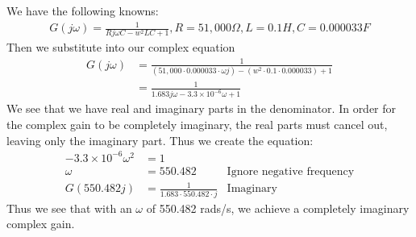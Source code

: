 \documentclass[12pt, a4paper]{article}
\begin{document}
\begin{enumerate}
We have the following knowns: 
\begin{align*}
G(j\omega) = \frac{1}{Rj\omega C - w^2 LC + 1}, R = 51,000 \Omega, L = 0.1 H, C = 0.000033 F
\end{align*}
Then we substitute into our complex equation
\begin{align*}
G(j\omega) &= \frac{1}{(51,000 \cdot 0.000033 \cdot \omega j) - (w^2 \cdot 0. 1 \cdot 0.000033) + 1} \\
&= \frac{1}{1.683 j \omega - 3.3 \times 10^{-6} \omega + 1}
\end{align*}
We see that we have real and imaginary parts in the denominator. In order for the complex gain to be completely imaginary, the real parts must cancel out, leaving only the imaginary part. Thus we create the equation:
\begin{align*}
-3.3\times 10^{-6} \omega ^2 &= 1 \\
\omega &= 550.482 &\text{Ignore negative frequency}\\
G(550.482 j) &= \frac{1}{1.683 \cdot 550.482 \cdot j} &\text{Imaginary}
\end{align*}
Thus we see that with an $\omega$ of 550.482 rads/s, we achieve a completely imaginary complex gain.
\end{enumerate}
\pagebreak
\end{document}
